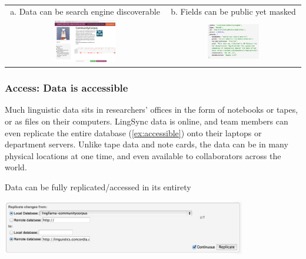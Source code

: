 \documentclass[letterpaper, 12pt, dvips]{mitwpl}
\begin{document}
\begin{exe} 
\ex \label{ex:discoverable}  ~  \\ 
 \begin{tabular}{c c} 
 a. Data can be search engine discoverable & b. Fields can be public yet masked \\
   \includegraphics[width=0.4\textwidth]{discoverable} & 
   \includegraphics[width=0.4\textwidth]{confidential}
\end{tabular}

\end{exe}


\subsubsection{\textbf{Access}: Data is accessible}
 
Much linguistic data sits in researchers' offices in the form of notebooks or tapes, or as files on their computers.  LingSync data is online, and team members can even replicate the entire database (\ref{ex:accessible}) onto their laptops or department servers. Unlike tape data and note cards, the data can be in many physical locations at one time, and even available to collaborators across the world. 

\begin{exe} 
\ex Data can be fully replicated/accessed in its entirety

 \centering
   \includegraphics[width=0.8\textwidth]{accessible}

\label{ex:accessible}
\end{exe}
\end{document}
